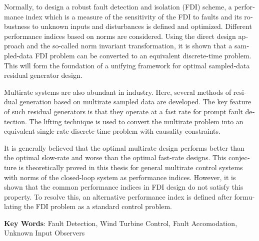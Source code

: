 \begin{latin}
\begin{small}
Normally, to design a robust fault detection and isolation (FDI)
scheme, a performance index which is a measure of the sensitivity of
the FDI to faults and its robustness to unknown inputs and
disturbances is defined and optimized. Different performance indices
based on norms are considered. Using the direct design
approach and the so-called norm invariant transformation, it is
shown that a sampled-data FDI problem can be converted to an
equivalent discrete-time problem. This will form the foundation of a
unifying framework for optimal sampled-data residual generator
design.

Multirate systems are also abundant in industry. Here, several
methods of residual generation based on multirate sampled data are
developed. The key feature of such residual generators is that they
operate at a fast rate for prompt fault detection. The lifting
technique is used to convert the multirate problem into an
equivalent single-rate discrete-time problem with causality
constraints.

It is generally believed that the optimal multirate design performs
better than the optimal slow-rate and worse than the optimal
fast-rate designs. This conjecture is theoretically proved in this
thesis for general multirate control systems with norms of the
closed-loop system as performance indices. However, it is shown that
the common performance indices in FDI design do not satisfy this
property. To resolve this, an alternative performance index is
defined after formulating the FDI problem as a standard control
problem.

\end{small}

\vspace{0.5 cm}

\noindent \textbf{Key Words}: Fault Detection, Wind Turbine Control, Fault Accomodation, Unknown Input Observers

\end{latin}